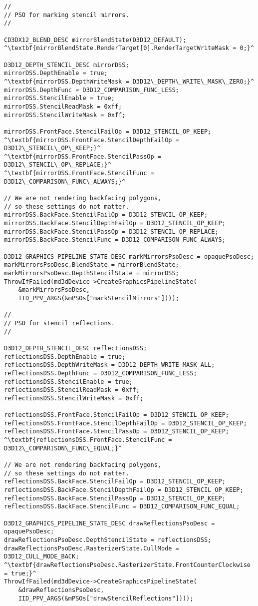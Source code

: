 \begin{lstlisting}[escapechar=^]
//
// PSO for marking stencil mirrors.
//

CD3DX12_BLEND_DESC mirrorBlendState(D3D12_DEFAULT);
^\textbf{mirrorBlendState.RenderTarget[0].RenderTargetWriteMask = 0;}^

D3D12_DEPTH_STENCIL_DESC mirrorDSS;
mirrorDSS.DepthEnable = true;
^\textbf{mirrorDSS.DepthWriteMask = D3D12\_DEPTH\_WRITE\_MASK\_ZERO;}^
mirrorDSS.DepthFunc = D3D12_COMPARISON_FUNC_LESS;
mirrorDSS.StencilEnable = true;
mirrorDSS.StencilReadMask = 0xff;
mirrorDSS.StencilWriteMask = 0xff;

mirrorDSS.FrontFace.StencilFailOp = D3D12_STENCIL_OP_KEEP;
^\textbf{mirrorDSS.FrontFace.StencilDepthFailOp = D3D12\_STENCIL\_OP\_KEEP;}^
^\textbf{mirrorDSS.FrontFace.StencilPassOp = D3D12\_STENCIL\_OP\_REPLACE;}^
^\textbf{mirrorDSS.FrontFace.StencilFunc = D3D12\_COMPARISON\_FUNC\_ALWAYS;}^

// We are not rendering backfacing polygons, 
// so these settings do not matter.
mirrorDSS.BackFace.StencilFailOp = D3D12_STENCIL_OP_KEEP;
mirrorDSS.BackFace.StencilDepthFailOp = D3D12_STENCIL_OP_KEEP;
mirrorDSS.BackFace.StencilPassOp = D3D12_STENCIL_OP_REPLACE;
mirrorDSS.BackFace.StencilFunc = D3D12_COMPARISON_FUNC_ALWAYS;

D3D12_GRAPHICS_PIPELINE_STATE_DESC markMirrorsPsoDesc = opaquePsoDesc;
markMirrorsPsoDesc.BlendState = mirrorBlendState;
markMirrorsPsoDesc.DepthStencilState = mirrorDSS;
ThrowIfFailed(md3dDevice->CreateGraphicsPipelineState(
    &markMirrorsPsoDesc, 
    IID_PPV_ARGS(&mPSOs["markStencilMirrors"])));

//
// PSO for stencil reflections.
//

D3D12_DEPTH_STENCIL_DESC reflectionsDSS;
reflectionsDSS.DepthEnable = true;
reflectionsDSS.DepthWriteMask = D3D12_DEPTH_WRITE_MASK_ALL;
reflectionsDSS.DepthFunc = D3D12_COMPARISON_FUNC_LESS;
reflectionsDSS.StencilEnable = true;
reflectionsDSS.StencilReadMask = 0xff;
reflectionsDSS.StencilWriteMask = 0xff;

reflectionsDSS.FrontFace.StencilFailOp = D3D12_STENCIL_OP_KEEP;
reflectionsDSS.FrontFace.StencilDepthFailOp = D3D12_STENCIL_OP_KEEP;
reflectionsDSS.FrontFace.StencilPassOp = D3D12_STENCIL_OP_KEEP;
^\textbf{reflectionsDSS.FrontFace.StencilFunc = D3D12\_COMPARISON\_FUNC\_EQUAL;}^

// We are not rendering backfacing polygons, 
// so these settings do not matter.
reflectionsDSS.BackFace.StencilFailOp = D3D12_STENCIL_OP_KEEP;
reflectionsDSS.BackFace.StencilDepthFailOp = D3D12_STENCIL_OP_KEEP;
reflectionsDSS.BackFace.StencilPassOp = D3D12_STENCIL_OP_KEEP;
reflectionsDSS.BackFace.StencilFunc = D3D12_COMPARISON_FUNC_EQUAL;

D3D12_GRAPHICS_PIPELINE_STATE_DESC drawReflectionsPsoDesc = opaquePsoDesc;
drawReflectionsPsoDesc.DepthStencilState = reflectionsDSS;
drawReflectionsPsoDesc.RasterizerState.CullMode = D3D12_CULL_MODE_BACK;
^\textbf{drawReflectionsPsoDesc.RasterizerState.FrontCounterClockwise = true;}^
ThrowIfFailed(md3dDevice->CreateGraphicsPipelineState(
    &drawReflectionsPsoDesc, 
    IID_PPV_ARGS(&mPSOs["drawStencilReflections"])));
\end{lstlisting}

